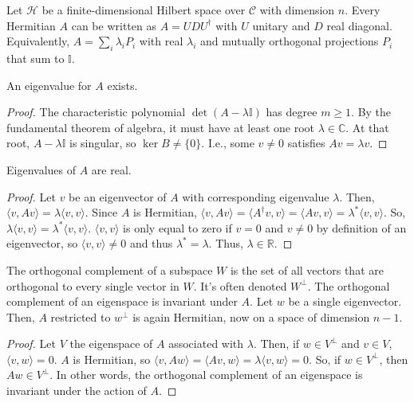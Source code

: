 	\begin{theorem}
			Let $\mathcal{H}$ be a finite-dimensional Hilbert space over $\mathcal{C}$ with dimension $n$. Every Hermitian $A$ can be written as $A = UDU^\dagger$ with $U$ unitary and $D$ real diagonal. Equivalently, $A = \sum_i \lambda_i P_i$ with real $\lambda_i$ and mutually orthogonal projections $P_i$ that sum to $\mathbb{I}$.
		\begin{lemma}
			An eigenvalue for $A$ exists.
		\end{lemma}
		\begin{proof}
			The characteristic polynomial $\det(A - \lambda\mathbb{I})$ has degree $m\ge 1$. By the fundamental theorem of algebra, it must have at least one root $\lambda \in \mathbb{C}$. At that root, $A-\lambda \mathbb{I}$ is singular, so $\ker B\ne\{0\}$. I.e., some $v\ne 0$ satisfies $Av=\lambda v$.
		\end{proof}
		\begin{lemma}
			Eigenvalues of $A$ are real.
		\end{lemma}
		\begin{proof}
			Let $v$ be an eigenvector of $A$ with corresponding eigenvalue $\lambda$. Then, $\langle v, Av\rangle = \lambda \langle v, v\rangle$. Since $A$ is Hermitian, $\langle v, Av\rangle =\langle A^\dagger v, v\rangle = \langle A v, v\rangle = \lambda^*\langle v, v\rangle$. So, $\lambda\langle v, v\rangle = \lambda^*\langle v, v\rangle$. $\langle v, v\rangle$ is only equal to zero if $v = 0$ and $v\ne 0$ by definition of an eigenvector, so $\langle v, v\rangle\ne 0$ and thus $\lambda^* = \lambda$. Thus, $\lambda \in \mathbb{R}$. 
		\end{proof}
		\begin{lemma}
			The orthogonal complement of a subspace $W$ is the set of all vectors that are orthogonal to every single vector in $W$. It's often denoted $W^\perp$. The orthogonal complement of an eigenspace is invariant under $A$. Let $w$ be a single eigenvector. Then, $A$ restricted to $w^\perp$ is again Hermitian, now on a space of dimension $n-1$.
		\end{lemma}
		\begin{proof}
			Let $V$ the eigenspace of $A$ associated with $\lambda$. Then, if $w \in V^\perp$ and $v\in V$, $\langle v, w\rangle= 0$. $A$ is Hermitian, so $\langle v, Aw\rangle = \langle Av, w\rangle=\lambda\langle v, w\rangle=0$. So, if $w\in V^\perp$, then $Aw \in V^\perp$. In other words, the orthogonal complement of an eigenspace is invariant under the action of $A$. 
			

\end{proof}
\end{theorem}
